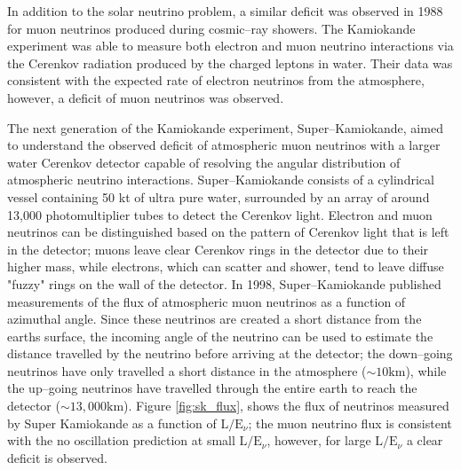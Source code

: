 In addition to the solar neutrino problem, a similar deficit was observed in
1988 for muon neutrinos produced during cosmic--ray showers.  The Kamiokande 
experiment was able to measure both electron and muon neutrino interactions 
via the Cerenkov radiation produced by the charged leptons in water. Their 
data was consistent with the expected rate of electron neutrinos from the 
atmosphere, however, a deficit of muon neutrinos was observed\cite{Hirata1988}. 

The next generation of the Kamiokande experiment, Super--Kamiokande, aimed to
understand the observed deficit of atmospheric muon neutrinos with a larger 
water Cerenkov detector capable of resolving the angular distribution of 
atmospheric neutrino interactions. Super--Kamiokande consists of a cylindrical 
vessel containing 50 kt of ultra pure water, surrounded by an array of around 
13,000 photomultiplier tubes to detect the Cerenkov light. Electron and muon 
neutrinos can be distinguished based on the pattern of Cerenkov light that is 
left in the detector; muons leave clear Cerenkov rings in the detector due to 
their higher mass, while electrons, which can scatter and shower, tend to leave 
diffuse "fuzzy" rings on the wall of the detector. In 1998, Super--Kamiokande 
published measurements of the flux of atmospheric muon neutrinos as a function 
of azimuthal angle\cite{Fukuda1998}. Since these neutrinos are created a 
short distance from the earths surface, the incoming angle of the neutrino can 
be used to estimate the distance travelled by the neutrino before arriving at 
the detector; the down--going neutrinos have only travelled a short distance in 
the atmosphere (\(\sim 10 \mbox{km}\)), while the up--going neutrinos have 
travelled through the entire earth to reach the detector 
(\(\sim 13,000 \mbox{km}\)). Figure \ref{fig:sk_flux}, shows the flux of 
neutrinos measured by Super Kamiokande as a function of 
\(\mbox{L} / \mbox{E}_\nu\); the muon neutrino flux is consistent with the no 
oscillation prediction at small \(\mbox{L} / \mbox{E}_\nu\), however, for 
large \(\mbox{L} / \mbox{E}_\nu\) a clear deficit is observed. 

